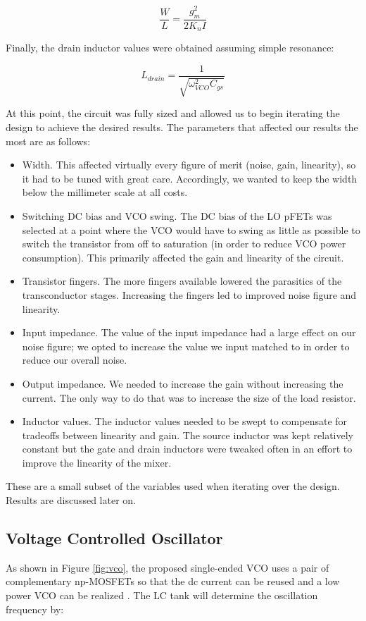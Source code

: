 \begin{equation}
\frac{W}{L} = \frac{g_{m}^2}{2K_{n}I}
\end{equation}

Finally, the drain inductor values were obtained assuming simple resonance:

\begin{equation}
L_{drain} = \frac{1}{\sqrt{\omega^{2}_{VCO}C_{gs}}}
\end{equation}

At this point, the circuit was fully sized and allowed us to begin iterating the design to achieve the desired results.
The parameters that affected our results the most are as follows:

\begin{itemize}
	\item Width. This affected virtually every figure of merit (noise, gain, linearity), so it had to be tuned with great care. Accordingly, we wanted to keep the width below the millimeter scale at all costs.
	\item Switching DC bias and VCO swing. The DC bias of the LO pFETs was selected at a point where the VCO would have to swing as little as possible to switch the transistor from off to saturation (in order to reduce VCO power consumption). This primarily affected the gain and linearity of the circuit.
	\item Transistor fingers. The more fingers available lowered the parasitics of the transconductor stages. Increasing the fingers led to improved noise figure and linearity.
	\item Input impedance. The value of the input impedance had a large effect on our noise figure; we opted to increase the value we input matched to in order to reduce our overall noise.
	\item Output impedance. We needed to increase the gain without increasing the current. The only way to do that was to increase the size of the load resistor.
	\item Inductor values. The inductor values needed to be swept to compensate for tradeoffs between linearity and gain. The source inductor was kept relatively constant but the gate and drain inductors were tweaked often in an effort to improve the linearity of the mixer.
\end{itemize}

These are a small subset of the variables used when iterating over the design. Results are discussed later on.

\subsection{Voltage Controlled Oscillator}
As shown in Figure \ref{fig:vco}, the proposed single-ended VCO uses a pair of complementary np-MOSFETs so that the dc current can be reused and a low power VCO can be realized \cite{vco}. The LC tank will determine the oscillation frequency by:

